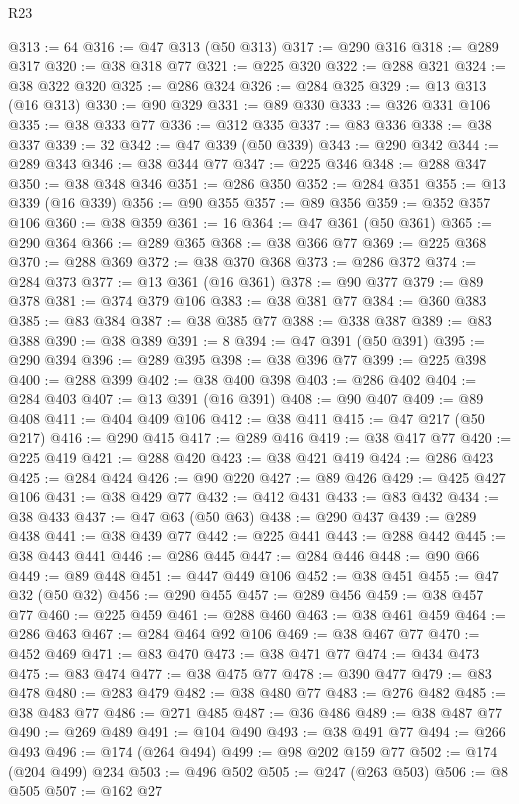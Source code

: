 \begin{lexlean}{R23}
\begin{coremodule}
@313 := 64
@316 := @47 @313 (@50 @313)
@317 := @290 @316
@318 := @289 @317
@320 := @38 @318 @77
@321 := @225 @320
@322 := @288 @321
@324 := @38 @322 @320
@325 := @286 @324
@326 := @284 @325
@329 := @13 @313 (@16 @313)
@330 := @90 @329
@331 := @89 @330
@333 := @326 @331 @106
@335 := @38 @333 @77
@336 := @312 @335
@337 := @83 @336
@338 := @38 @337
@339 := 32
@342 := @47 @339 (@50 @339)
@343 := @290 @342
@344 := @289 @343
@346 := @38 @344 @77
@347 := @225 @346
@348 := @288 @347
@350 := @38 @348 @346
@351 := @286 @350
@352 := @284 @351
@355 := @13 @339 (@16 @339)
@356 := @90 @355
@357 := @89 @356
@359 := @352 @357 @106
@360 := @38 @359
@361 := 16
@364 := @47 @361 (@50 @361)
@365 := @290 @364
@366 := @289 @365
@368 := @38 @366 @77
@369 := @225 @368
@370 := @288 @369
@372 := @38 @370 @368
@373 := @286 @372
@374 := @284 @373
@377 := @13 @361 (@16 @361)
@378 := @90 @377
@379 := @89 @378
@381 := @374 @379 @106
@383 := @38 @381 @77
@384 := @360 @383
@385 := @83 @384
@387 := @38 @385 @77
@388 := @338 @387
@389 := @83 @388
@390 := @38 @389
@391 := 8
@394 := @47 @391 (@50 @391)
@395 := @290 @394
@396 := @289 @395
@398 := @38 @396 @77
@399 := @225 @398
@400 := @288 @399
@402 := @38 @400 @398
@403 := @286 @402
@404 := @284 @403
@407 := @13 @391 (@16 @391)
@408 := @90 @407
@409 := @89 @408
@411 := @404 @409 @106
@412 := @38 @411
@415 := @47 @217 (@50 @217)
@416 := @290 @415
@417 := @289 @416
@419 := @38 @417 @77
@420 := @225 @419
@421 := @288 @420
@423 := @38 @421 @419
@424 := @286 @423
@425 := @284 @424
@426 := @90 @220
@427 := @89 @426
@429 := @425 @427 @106
@431 := @38 @429 @77
@432 := @412 @431
@433 := @83 @432
@434 := @38 @433
@437 := @47 @63 (@50 @63)
@438 := @290 @437
@439 := @289 @438
@441 := @38 @439 @77
@442 := @225 @441
@443 := @288 @442
@445 := @38 @443 @441
@446 := @286 @445
@447 := @284 @446
@448 := @90 @66
@449 := @89 @448
@451 := @447 @449 @106
@452 := @38 @451
@455 := @47 @32 (@50 @32)
@456 := @290 @455
@457 := @289 @456
@459 := @38 @457 @77
@460 := @225 @459
@461 := @288 @460
@463 := @38 @461 @459
@464 := @286 @463
@467 := @284 @464 @92 @106
@469 := @38 @467 @77
@470 := @452 @469
@471 := @83 @470
@473 := @38 @471 @77
@474 := @434 @473
@475 := @83 @474
@477 := @38 @475 @77
@478 := @390 @477
@479 := @83 @478
@480 := @283 @479
@482 := @38 @480 @77
@483 := @276 @482
@485 := @38 @483 @77
@486 := @271 @485
@487 := @36 @486
@489 := @38 @487 @77
@490 := @269 @489
@491 := @104 @490
@493 := @38 @491 @77
@494 := @266 @493
@496 := @174 (@264 @494)
@499 := @98 @202 @159 @77
@502 := @174 (@204 @499) @234
@503 := @496 @502
@505 := @247 (@263 @503)
@506 := @8 @505
@507 := @162 @27

\end{coremodule}
\end{lexlean}
